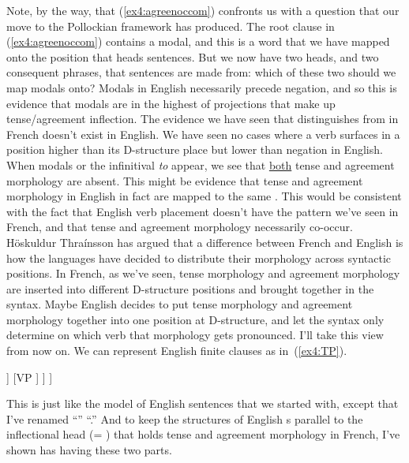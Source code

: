 Note, by the way, that (\ref{ex4:agreenoccom}) confronts us with a question that our move to the Pollockian framework has produced. The root clause in (\ref{ex4:agreenoccom}) contains a modal, and this is a word that we have mapped onto the position that heads sentences. But we now have two heads, and two consequent phrases, that sentences are made from: which of these two should we map modals onto? Modals in English necessarily precede negation, and so this is evidence that modals are in the highest of projections that make up tense/agreement inflection. The evidence we have seen that distinguishes  from  in French doesn't exist in English. We have seen no cases where a verb surfaces in a position higher than its D-structure place but lower than negation in English. When modals or the infinitival \emph{to} appear, we see that \underline{both} tense and agreement morphology are absent. This might be evidence that tense and agreement morphology in English in fact are mapped to the same . This would be consistent with the fact that English verb placement doesn't have the pattern we've seen in French, and that tense and agreement morphology necessarily co-occur. H\"oskuldur Thra\'insson\cite{Thrainsson:1996} has argued that a difference between French and English is how the languages have decided to distribute their morphology across syntactic positions. In French, as we've seen, tense morphology and agreement morphology are inserted into different D-structure positions and brought together in the syntax. Maybe English decides to put tense morphology and agreement morphology together into one  position at D-structure, and let the syntax only determine on which verb that morphology gets pronounced. I'll take this view from now on. We can represent English finite clauses as in~(\ref{ex4:TP}).%
%
%
%
\begin{exe}
	\raggedright
	\ex \label{ex4:TP}
	\small
	\begin{forest}
	[TP
		[XP ]
		[\ibar{T}
			[\obar{T}
				[\obar{Agr} ]
				[\obar{T} ]
			 ]
			[VP ]
		 ]
	]
	\end{forest}
\end{exe}
This is just like the model of English sentences that we started with, except that I've renamed ``'' ``.'' And to keep the structures of English s parallel to the inflectional head (= ) that holds tense and agreement morphology in French, I've shown  has having these two parts.


